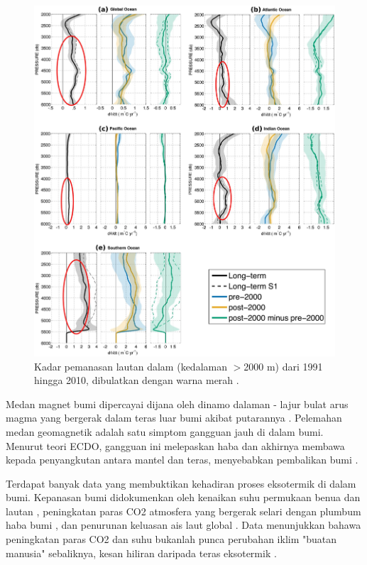 \documentclass[10pt,twocolumn,letterpaper]{article}
\begin{document}
\begin{figure}[t]
\begin{center}
   \includegraphics[width=1\linewidth]{ocean-highlight.jpg}
\end{center}
   \caption{Kadar pemanasan lautan dalam (kedalaman $>$2000 m) dari 1991 hingga 2010, dibulatkan dengan warna merah \cite{132}.}
\label{fig:15}
\label{fig:onecol}
\end{figure}

Medan magnet bumi dipercayai dijana oleh dinamo dalaman - lajur bulat arus magma yang bergerak dalam teras luar bumi akibat putarannya \cite{123}. Pelemahan medan geomagnetik adalah satu simptom gangguan jauh di dalam bumi. Menurut teori ECDO, gangguan ini melepaskan haba dan akhirnya membawa kepada penyangkutan antara mantel dan teras, menyebabkan pembalikan bumi \cite{1}.

Terdapat banyak data yang membuktikan kehadiran proses eksotermik di dalam bumi. Kepanasan bumi didokumenkan oleh kenaikan suhu permukaan benua dan lautan \cite{127,128}, peningkatan paras CO2 atmosfera yang bergerak selari dengan plumbum haba bumi \cite{129,130}, dan penurunan keluasan ais laut global \cite{131}. Data menunjukkan bahawa peningkatan paras CO2 dan suhu bukanlah punca perubahan iklim "buatan manusia" sebaliknya, kesan hiliran daripada teras eksotermik \cite{129}.
\end{document}
